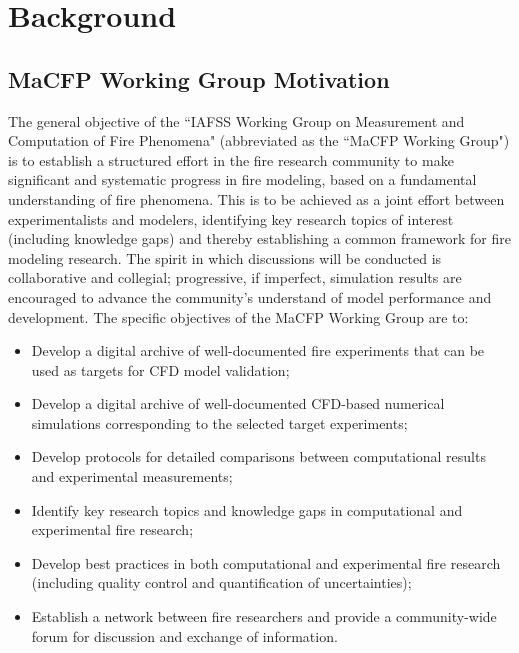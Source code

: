 \documentclass[12pt]{article}
\begin{document}
\pagestyle{empty}
\newpage
\section{Background}
\label{sec:Background}
\subsection{MaCFP Working Group Motivation}
The general objective of the ``IAFSS Working Group on Measurement and Computation of Fire Phenomena" (abbreviated as the ``MaCFP Working Group") is to establish a structured effort in the fire research community to make significant and systematic progress in fire modeling, based on a fundamental understanding of fire phenomena. This is to be achieved as a joint effort between experimentalists and modelers, identifying key research topics of interest (including knowledge gaps) and thereby establishing a common framework for fire modeling research. The spirit in which discussions will be conducted is collaborative and collegial; progressive, if imperfect, simulation results are encouraged to advance the community's understand of model performance and development. The specific objectives of the MaCFP Working Group are to:
\begin{itemize}[noitemsep]
 \item Develop a digital archive of well-documented fire experiments that can be used as targets for CFD model validation;
 \item Develop a digital archive of well-documented CFD-based numerical simulations corresponding to the selected target experiments;
 \item Develop protocols for detailed comparisons between computational results and experimental measurements;
 \item Identify key research topics and knowledge gaps in computational and experimental fire research;
 \item Develop best practices in both computational and experimental fire research (including quality control and quantification of uncertainties);
 \item Establish a network between fire researchers and provide a community-wide forum for discussion and exchange of information.
\end{itemize}
\end{document}
